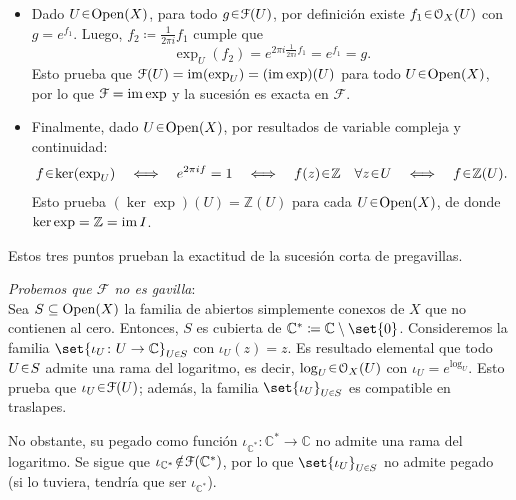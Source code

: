 \begin{sol}
\begin{itemize}
\item Dado $U\en\Open(X)$, para todo $g\en\mathcal F(U)$, por definición existe $f_1\en\mathcal O_X(U)$ con $g=e^{f_1}$. Luego, $f_2\coloneq\frac{1}{2\pi i}f_1$ cumple que
\[
\exp_U(f_2)=e^{2\pi i\frac{1}{2\pi i}f_1}=e^{f_1}=g.
\]
Esto prueba que $\mathcal F(U)=\operatorname{im}(\exp_U)=(\operatorname{im}\exp)(U)$ para todo $U\en\Open(X)$, por lo que $\mathcal F=\operatorname{im}\exp$ y la sucesión es exacta en $\mathcal F$.

\item Finalmente, dado $U\en\Open(X)$, por resultados de variable compleja y continuidad:
\[
f\en\ker(\exp_U)
\quad\Longleftrightarrow\quad e^{2\pi i f}=1
\quad\Longleftrightarrow\quad f(z)\en\mathbb Z\quad\forall z\en U
\quad\Longleftrightarrow\quad f\en\mathbb Z(U).
\]
Esto prueba $(\ker\exp)(U)=\mathbb Z(U)$ para cada $U\en\Open(X)$, de donde $\ker\exp=\mathbb Z=\operatorname{im} I$.
\end{itemize}
Estos tres puntos prueban la exactitud de la sucesión corta de pregavillas.

\medskip
\noindent\emph{Probemos que $\mathcal F$ no es gavilla}:\\
Sea $S\subseteq\operatorname{Open}(X)$ la familia de abiertos simplemente conexos de $X$ que no contienen al cero. Entonces, $S$ es cubierta de $\mathbb C^*\coloneq\mathbb C\setminus\set{0}$. Consideremos la familia $\set{\iota_U\colon U\to\mathbb C}_{U\en S}$ con $\iota_U(z)=z$. Es resultado elemental que todo $U\en S$ admite una rama del logaritmo, es decir, $\log_U\en\mathcal O_X(U)$ con $\iota_U=e^{\log_U}$. Esto prueba que $\iota_U\en\mathcal F(U)$; además, la familia $\set{\iota_U}_{U\en S}$ es compatible en traslapes.

No obstante, su pegado como función $\iota_{\mathbb C^*}\colon\mathbb C^*\to\mathbb C$ no admite una rama del logaritmo. Se sigue que $\iota_{\mathbb C^*}\noten\mathcal F(\mathbb C^*)$, por lo que $\set{\iota_U}_{U\en S}$ no admite pegado (si lo tuviera, tendría que ser $\iota_{\mathbb C^*}$).
\end{sol}
